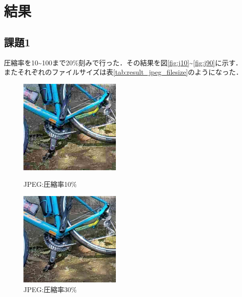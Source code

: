 \documentclass[a4paper,11pt]{bxjsarticle}
\begin{document}
\section{結果}
  \subsection{課題1}
  圧縮率を10\textasciitilde100まで20\%刻みで行った．その結果を図\ref{fig:j10}\textasciitilde\ref{fig:j90}に示す．
  またそれぞれのファイルサイズは表\ref{tab:result_jpeg_filesize}のようになった．

  \begin{figure}[htbp]
    \begin{minipage}{0.5\hsize}
     \begin{center}
      \includegraphics[width=50mm]{sample_j10.jpg}
     \end{center}
     \caption{JPEG:圧縮率10\%}
     \label{fig:j10}
    \end{minipage}
    \begin{minipage}{0.5\hsize}
     \begin{center}
      \includegraphics[width=50mm]{sample_j30.jpg}
     \end{center}
     \caption{JPEG:圧縮率30\%}
     \label{fig:j30}
    \end{minipage}
   \end{figure}
\end{document}
